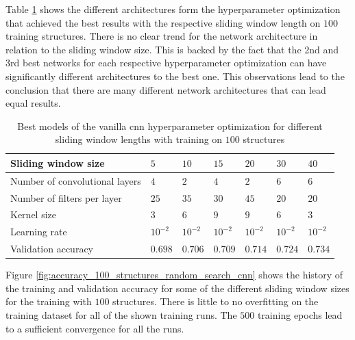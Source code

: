 \documentclass[conference]{IEEEtran}
\begin{document}
Table \ref{tab:hyperparameters_100_structures} shows the different architectures form the hyperparameter optimization that achieved the best results with the respective sliding window length on $ 100 $ training structures. There is no clear trend for the network architecture in relation to the sliding window size. This is backed by the fact that the 2nd and 3rd best networks for each respective hyperparameter optimization can have significantly different architectures to the best one. This observations lead to the conclusion that there are many different network architectures that can lead equal results.

\begin{table}[htp]
	\centering
	\caption{Best models of the vanilla \gls{cnn} hyperparameter optimization for different sliding window lengths with training on $ 100 $ structures}
	\label{tab:hyperparameters_100_structures}
	\setlength{\tabcolsep}{3pt} %
	\begin{tabular}{p{2.5cm}|llllll}
		Sliding window size & $ 5 $ & $ 10 $ & $ 15 $ & $ 20 $ & $ 30 $ & $ 40 $ \\
		\hline
		Number of convolutional layers & $ 4 $ & $ 2 $ & $ 4 $ & $ 2 $ & $ 6 $ & $ 6 $ \\
		Number of filters per layer & $ 25 $ & $ 35 $ & $ 30 $ & $ 45 $ & $ 20 $ & $ 20 $ \\
		Kernel size & $ 3 $ & $ 6 $ & $ 9 $ & $ 9 $ & $ 6 $ & $ 3 $ \\
		Learning rate & $ 10^{-2} $ & $ 10^{-2} $ & $ 10^{-2} $ & $ 10^{-2} $ & $ 10^{-2} $ & $ 10^{-2} $ \\
		\hline
		Validation accuracy & $ 0.698 $ & $ 0.706 $ & $ 0.709 $ & $ 0.714 $ & $ 0.724 $ & $ 0.734 $
	\end{tabular}
\end{table}

Figure \ref{fig:accuracy_100_structures_random_search_cnn} shows the history of the training and validation accuracy for some of the different sliding window sizes for the training with $ 100 $ structures. There is little to no overfitting on the training dataset for all of the shown training runs. The $ 500 $ training epochs lead to a sufficient convergence for all the runs.
\end{document}
